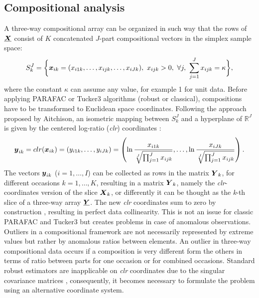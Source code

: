 \documentclass[article,shortnames, nojss]{jss}
\newcommand{\vv}[1]{\mbox{\boldmath$#1$}}
\begin{document}
\subsection{Compositional analysis}
\label{sec:compositional}
A three-way compositional array can be organized in such way that the rows of
 $\vv{\underline{X}}$ consist of $K$ concatenated $J$-part compositional vectors in the simplex sample space:
\begin{equation}
S_{k}^J=\biggl\{\vv{x}_{ik}=(x_{i1k},\ldots,x_{ijk},\ldots,x_{iJk}),~x_{ijk}> 0,~\forall j,~{\displaystyle{\sum_{j=1}^J
x_{ijk}}}=\kappa\biggl\},
\end{equation}
where the constant $\kappa$ can assume any value, for example 1 for unit data.
Before applying PARAFAC or Tucker3 algorithms (robust or classical), compositions
have to be transformed to  Euclidean space coordinates. Following the approach proposed by
Aitchison, an isometric mapping between $S_{k}^J$ and a hyperplane of ${\mathbb R}^{J}$
is given by the centered log-ratio (\textit{clr}) coordinates \citet{Ait86}:
\begin{equation}
\label{clrtrafo}
\vv{y}_{ik} = clr(\vv{x}_{ik})=(y_{i1k},\ldots ,y_{iJk})=
\left(\ln {\frac{x_{i1k}}{\sqrt[J]{\prod_{j=1}^J {x_{ijk}}}}},\ldots,
\ln {\frac{x_{iJk}}{\sqrt[J]{\prod_{j=1}^J {x_{ijk}}}}}\right).
\end{equation}
The vectors $\vv{y}_{ik}$ ($i=1,\ldots ,I$) can be collected as rows in
the matrix $\vv{Y}_k$, for different occasions $k=1,\ldots, K$, resulting
in a matrix $\vv{Y}_k$, namely the \textit{clr}-coordinates version of
the slice $\vv{X}_k$, or differently it can be thought as the
\textit{k}-th slice of a three-way array $\vv{\underline{Y}}$.
The new \textit{clr} coordinates sum to zero by construction
\citep{Ait86}, resulting in perfect data collinearity. This is not an issue for classic PARAFAC and Tucker3 but creates problems in case of anomalous observations.
Outliers in a compositional framework are not necessarily represented by extreme values but rather by anomalous ratios between elements. An outlier in three-way compositional data occurs if a composition is very different form the others in terms of ratio between parts for one occasion or for combined occasions. Standard robust estimators are inapplicable on \textit{clr} coordinates due to the singular covariance matrices \citep{maronna:2006}, consequently, it becomes necessary to formulate the problem using an alternative coordinate system.\\\\
\end{document}
